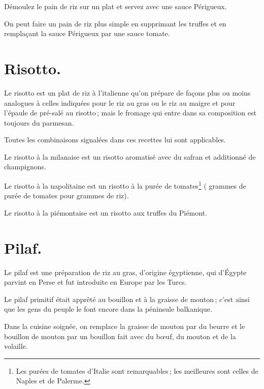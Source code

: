 Démoulez le pain de riz sur un plat et servez avec une sauce Périgueux.

\sk

On peut faire un pain de riz plus simple en supprimant les truffes et en
remplaçant la sauce Périgueux par une sauce tomate.

\section*{\centering Risotto.}
{}
\label{pg0712-2} \hypertarget{p0712-2}{}

Le risotto est un plat de riz à l'italienne qu'on prépare de façons plus ou
moins analogues à celles indiquées pour le riz au gras ou le riz au maigre et
pour l'épaule de pré-salé au risotto ; mais le fromage qui entre dans sa
composition est toujours du parmesan.

Toutes les combinaisons signalées dans ces recettes lui sont applicables.

\sk

Le risotto à la milanaise est un risotto aromatisé avec du safran et additionné
de champignons.

\sk

Le risotto à la napolitaine est un risotto à la purée de tomates\footnote{Les
purées de tomates d'Italie sont remarquables ; les meilleures sont celles de
Naples et de Palerme.} ({\mmm} grammes de purée de tomates pour
{\mmm} grammes de riz).

\sk

Le risotto à la piémontaise est un risotto aux truffes du Piémont.

\section*{\centering Pilaf.}
{}
\label{pg0712} \hypertarget{p0712}{}

Le pilaf est une préparation de riz au gras, d'origine égyptienne, qui d'Égypte
parvint en Perse et fut introduite en Europe par les Turcs.

Le pilaf primitif était apprêté au bouillon et à la graisse de mouton ; c'est
ainsi que les gens du peuple le font encore dans la péninsule balkanique.

Dans la cuisine soignée, on remplace la graisse de mouton par du beurre et
le bouillon de mouton par un bouillon fait avec du bœuf, du mouton et de la
volaille.

